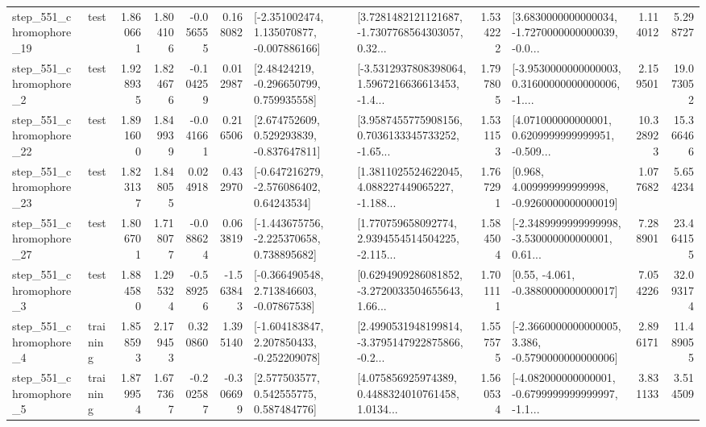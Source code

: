 \begin{tabular}{llrrrrllrlrr}
  step\_551\_chromophore\_19 &      test &      1.860661 &    1.804106 &     -0.056555 &  0.168082 &   [-2.351002474, 1.135070877, -0.007886166] &  [3.7281482121121687, -1.7307768564303057, 0.32... &       1.534222 &  [3.6830000000000034, -1.7270000000000039, -0.0... &            1.114012 &          5.298727 \\
   step\_551\_chromophore\_2 &      test &      1.928935 &    1.824676 &     -0.104259 &  0.012987 &     [2.48424219, -0.296650799, 0.759935558] &  [-3.5312937808398064, 1.5967216636613453, -1.4... &       1.797805 &  [-3.9530000000000003, 0.31600000000000006, -1.... &            2.159501 &         19.073052 \\
  step\_551\_chromophore\_22 &      test &      1.891600 &    1.849939 &     -0.041661 &  0.216506 &    [2.674752609, 0.529293839, -0.837647811] &  [3.9587455775908156, 0.7036133345733252, -1.65... &       1.531153 &  [4.071000000000001, 0.6209999999999951, -0.509... &           10.328923 &         15.366466 \\
  step\_551\_chromophore\_23 &      test &      1.823137 &    1.848055 &      0.024918 &  0.432970 &    [-0.647216279, -2.576086402, 0.64243534] &  [1.3811025524622045, 4.088227449065227, -1.188... &       1.767291 &    [0.968, 4.009999999999998, -0.9260000000000019] &            1.077682 &          5.654234 \\
  step\_551\_chromophore\_27 &      test &      1.806701 &    1.718077 &     -0.088624 &  0.063819 &   [-1.443675756, -2.225370658, 0.738895682] &  [1.770759658092774, 2.9394554514504225, -2.115... &       1.584504 &  [-2.3489999999999998, -3.530000000000001, 0.61... &            7.288901 &         23.464155 \\
   step\_551\_chromophore\_3 &      test &      1.884580 &    1.295324 &     -0.589256 & -1.563843 &    [-0.366490548, 2.713846603, -0.07867538] &  [0.6294909286081852, -3.2720033504655643, 1.66... &       1.701111 &                [0.55, -4.061, -0.3880000000000017] &            7.054226 &         32.093174 \\
   step\_551\_chromophore\_4 &  training &      1.858593 &    2.179453 &      0.320860 &  1.395140 &   [-1.604183847, 2.207850433, -0.252209078] &  [2.4990531948199814, -3.3795147922875866, -0.2... &       1.557575 &  [-2.3660000000000005, 3.386, -0.5790000000000006] &            2.896171 &         11.489055 \\
   step\_551\_chromophore\_5 &  training &      1.879954 &    1.677367 &     -0.202587 & -0.306699 &     [2.577503577, 0.542555775, 0.587484776] &  [4.075856925974389, 0.4488324010761458, 1.0134... &       1.560534 &  [-4.082000000000001, -0.6799999999999997, -1.1... &            3.831133 &          3.514509 \\

\end{tabular}
